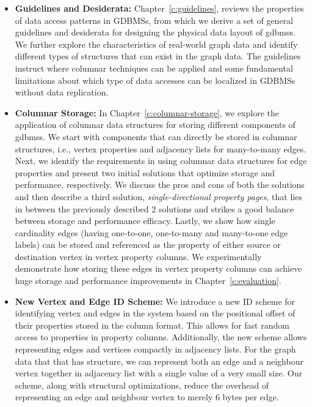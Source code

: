 \begin{itemize}
	\item \textbf{Guidelines and Desiderata:} Chapter~\ref{c:guidelines}, reviews the properties of data access patterns in GDBMSs, from which we derive a set of general guidelines and desiderata for designing the physical data layout of \gls{gdbms}s. We further explore the characteristics of real-world graph data and identify different types of structures that can exist in the graph data. The guidelines instruct where columnar techniques can be applied and some fundamental limitations about which type of data accesses can be localized in GDBMSs without data replication.
	
	\item \textbf{Columnar Storage:} In Chapter~\ref{c:columnar-storage}, we explore the application of columnar data structures for storing different components of \gls{gdbms}s. We start with components that can directly be stored in columnar structures, i.e., vertex properties and adjacency lists for many-to-many edges. Next, we identify the requirements in using columnar data structures for edge properties and present two initial solutions that optimize storage and performance, respectively. We discuss the pros and cons of both the solutions and then describe a third solution, \emph{single-directional property pages}, that lies in between the previously described 2 solutions and strikes a good balance between storage and performance efficacy. Lastly, we show how single cardinality edges (having one-to-one, one-to-many and many-to-one edge labels) can be stored and referenced as the property of either source or destination vertex in vertex property columns. We experimentally demonstrate how storing these edges in vertex property columns can achieve huge storage and performance improvements in Chapter~\ref{c:evaluation}.
	
	\item \textbf{New Vertex and Edge ID Scheme:} We introduce a new ID scheme for identifying vertex and edges in the system based on the positional offset of their properties stored in the column format. This allows for fast random access to properties in property columns. Additionally, the new scheme allows representing edges and vertices compactly in adjacency lists. For the graph data that that has structure, we can represent both an edge and a neighbour vertex together in adjacency list with a single value of a very small size. Our scheme, along with structural optimizations, reduce the overhead of representing an edge and neighbour vertex to merely 6 bytes per edge.
	

\end{itemize}
